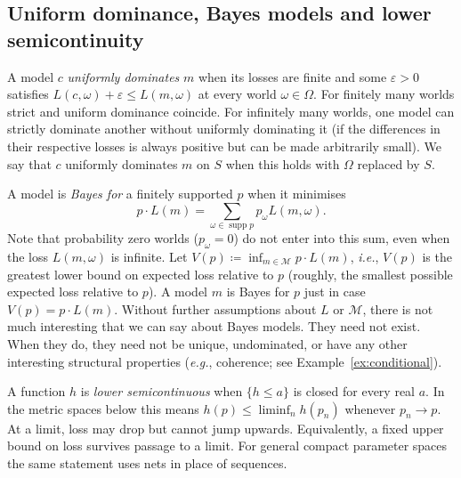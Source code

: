 \documentclass[11pt]{article}
\theoremstyle{definition}
\theoremstyle{remark}
\newcommand{\M}{\mathcal M}
\newcommand{\supp}{\operatorname{supp}}
\begin{document}
\subsection{Uniform dominance, Bayes models and lower semicontinuity}\label{sec:ordinal}
A model $c$ \emph{uniformly dominates} $m$ when its losses are finite and some $\varepsilon>0$ satisfies $L(c,\omega)+\varepsilon\le L(m,\omega)$ at every world $\omega\in\Omega$. For finitely many worlds strict and uniform dominance coincide. For infinitely many worlds, one model can strictly dominate another without uniformly dominating it (if the differences in their respective losses is always positive but can be made arbitrarily small). We say that $c$ uniformly dominates $m$ on $S$ when this holds with $\Omega$ replaced by $S$.

A model is \emph{Bayes for} a finitely supported $p$ when it minimises
\[
 p\cdot L(m)=\sum_{\omega\in\supp p}p_\omega L(m,\omega).
\]
Note that probability zero worlds ($p_\omega=0$) do not enter into this sum, even when the loss $L(m,\omega)$ is infinite. Let $V(p)\coloneqq \inf_{m\in\M}p\cdot L(m)$, \textit{i.e.}, $V(p)$ is the greatest lower bound on expected loss relative to $p$ (roughly, the smallest possible expected loss relative to $p$). A model $m$ is Bayes for $p$ just in case $V(p)=p\cdot L(m)$. Without further assumptions about $L$ or $\M$, there is not much interesting that we can say about Bayes models. They need not exist. When they do, they need not be unique, undominated, or have any other interesting structural properties (\textit{e.g.}, coherence; see Example~\ref{ex:conditional}).

A function $h$ is \emph{lower semicontinuous} when $\{h\le a\}$ is closed for every real $a$. In the metric spaces below this means $h(p)\le\liminf_n h(p_n)$ whenever $p_n\to p$. At a limit, loss may drop but cannot jump upwards. Equivalently, a fixed upper bound on loss survives passage to a limit. For general compact parameter spaces the same statement uses nets in place of sequences.
\end{document}
